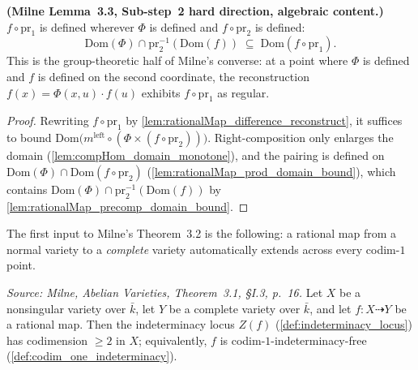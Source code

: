 \begin{lemma}\leanok
  \label{lem:difference_map_domain_reconstruction}
  \textbf{(Milne Lemma~3.3, Sub-step~2 hard direction, algebraic content.)}
  \(f \circ \mathrm{pr}_1\) is defined wherever \(\Phi\) is defined and \(f \circ
  \mathrm{pr}_2\) is defined:
  \[
    \mathrm{Dom}(\Phi) \cap \mathrm{pr}_2^{-1}(\mathrm{Dom}(f)) \;\subseteq\;
    \mathrm{Dom}(f \circ \mathrm{pr}_1) .
  \]
  This is the group-theoretic half of Milne's converse: at a point where \(\Phi\) is
  defined and \(f\) is defined on the second coordinate, the reconstruction
  \(f(x) = \Phi(x,u) \cdot f(u)\) exhibits \(f \circ \mathrm{pr}_1\) as regular.
\end{lemma}
\begin{proof}\leanok
  Rewriting \(f \circ \mathrm{pr}_1\) by
  \cref{lem:rationalMap_difference_reconstruct}, it suffices to bound
  \(\mathrm{Dom}\bigl(m^{\mathrm{left}} \circ (\Phi \times (f \circ \mathrm{pr}_2))\bigr)\).
  Right-composition only enlarges the domain (\cref{lem:compHom_domain_monotone}), and the
  pairing is defined on \(\mathrm{Dom}(\Phi) \cap \mathrm{Dom}(f \circ \mathrm{pr}_2)\)
  (\cref{lem:rationalMap_prod_domain_bound}), which contains \(\mathrm{Dom}(\Phi) \cap
  \mathrm{pr}_2^{-1}(\mathrm{Dom}(f))\) by \cref{lem:rationalMap_precomp_domain_bound}.
\end{proof}

The first input to Milne's Theorem~3.2 is the following: a rational map from a normal
variety to a \emph{complete} variety automatically extends across every codim-\(1\)
point.

\begin{theorem}\leanok
  \label{thm:codim_one_extension}
  \textit{Source: Milne, \emph{Abelian Varieties}, Theorem~3.1, \S I.3, p.~16.}
  Let \(X\) be a nonsingular variety over \(\bar k\), let \(Y\) be a complete variety over
  \(\bar k\), and let \(f \colon X \dashrightarrow Y\) be a rational map. Then the
  indeterminacy locus \(Z(f)\) (\cref{def:indeterminacy_locus}) has codimension
  \(\geq 2\) in \(X\); equivalently, \(f\) is codim-\(1\)-indeterminacy-free
  (\cref{def:codim_one_indeterminacy}).
\end{theorem}

